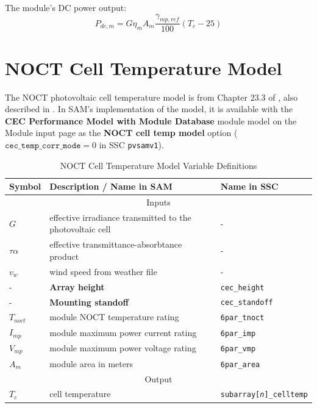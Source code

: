 \documentclass[12pt,letterpaper]{article}
\begin{document}
The module's DC power output:
\begin{equation}
P_{dc,m} = G \eta_m A_m \frac{\gamma_{mp,ref}}{100} (T_c - 25)
\end{equation}


\section{NOCT Cell Temperature Model} \label{sec-tcnoct}

The NOCT photovoltaic cell temperature model is from Chapter 23.3 of \citet{duffie2013}, also described in \citet{desoto2004b}. In SAM's implementation of the model, it is available with the \textbf{CEC Performance Model with Module Database} module model on the Module input page as the \textbf{NOCT cell temp model} option ($\mathtt{cec\_temp\_corr\_mode}=0$ in SSC \texttt{pvsamv1}).

\begin{table}
\begin{center}
\caption{NOCT Cell Temperature Model Variable Definitions}
\begin{tabular}{lll}
\midrule
Symbol & Description / \textbf{Name in SAM} & Name in SSC \\
\midrule
\multicolumn{3}{c}{Inputs}\\
$G$ & effective irradiance transmitted to the photovoltaic cell & - \\
$\tau \alpha$ & effective transmittance-absorbtance product & - \\
$v_{w}$ & wind speed from weather file & - \\
- & \textbf{Array height} & \texttt{cec\_height} \\
- & \textbf{Mounting standoff} & \texttt{cec\_standoff} \\
$T_{noct}$ & module NOCT temperature rating & \texttt{6par\_tnoct} \\
$I_{mp}$ & module maximum power current rating & \texttt{6par\_imp} \\
$V_{mp}$ & module maximum power voltage rating & \texttt{6par\_vmp} \\
$A_m$ & module area in meters & \texttt{6par\_area} \\
\midrule
\multicolumn{3}{c}{Output}\\
$T_c$ & cell temperature & \texttt{subarray[\textit{n}]\_celltemp} \\
\hline
\end{tabular}
\label{tab-tempnoct}
\end{center}
\end{table}
\end{document}
